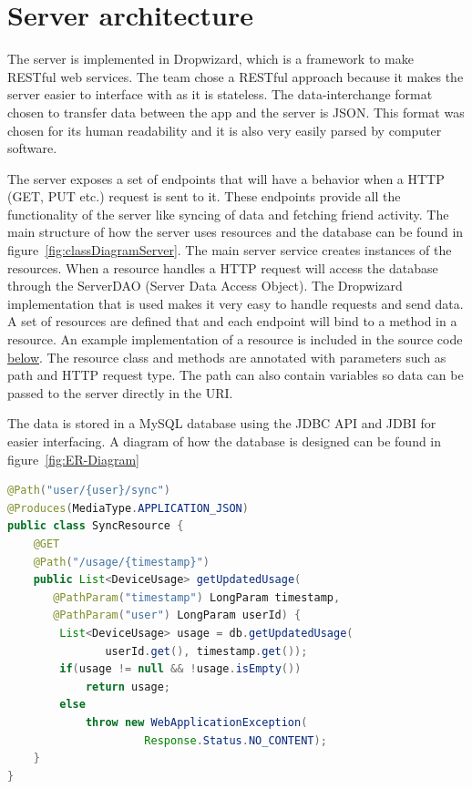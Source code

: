 \section{Server architecture}
The server is implemented in Dropwizard, which is a framework to make RESTful web services. The team chose a RESTful approach because it makes the server easier to interface with as it is stateless. The data-interchange format chosen to transfer data between the app and the server is JSON. This format was chosen for its human readability and it is also very easily parsed by computer software.

The server exposes a set of endpoints that will have a behavior when a HTTP (GET, PUT etc.) request is sent to it. These endpoints provide all the functionality of the server like syncing of data and fetching friend activity. The main structure of how the server uses resources and the database can be found in figure~\ref{fig:classDiagramServer}. The main server service creates instances of the resources. When a resource handles a HTTP request will access the database through the ServerDAO (Server Data Access Object). The Dropwizard implementation that is used makes it very easy to handle requests and send data. A set of resources are defined that and each endpoint will bind to a method in a resource. An example implementation of a resource is included in the source code \hyperref[lst:dropwizardResource]{below}. The resource class and methods are annotated with parameters such as path and HTTP request type. The path can also contain variables so data can be passed to the server directly in the URI. 

The data is stored in a MySQL database using the JDBC API and JDBI for easier interfacing. A diagram of how the database is designed can be found in figure~\ref{fig:ER-Diagram}


\begin{lstlisting}[language=java, frame=single, breaklines=true, caption={Dropwizard resource example}, label={lst:dropwizardResource}]
@Path("user/{user}/sync")
@Produces(MediaType.APPLICATION_JSON)
public class SyncResource {
    @GET
    @Path("/usage/{timestamp}")
    public List<DeviceUsage> getUpdatedUsage(
	   @PathParam("timestamp") LongParam timestamp, 
	   @PathParam("user") LongParam userId) {
        List<DeviceUsage> usage = db.getUpdatedUsage(
		       userId.get(), timestamp.get());
        if(usage != null && !usage.isEmpty())
            return usage;
        else
            throw new WebApplicationException(
			         Response.Status.NO_CONTENT);
    }
}
\end{lstlisting}

